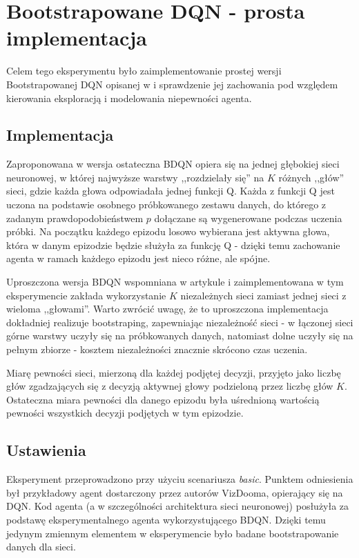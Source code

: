 \section{Bootstrapowane DQN - prosta implementacja}
Celem tego eksperymentu było zaimplementowanie prostej wersji Bootstrapowanej DQN opisanej w \cite{DBLP:journals/corr/OsbandBPR16} i sprawdzenie jej zachowania pod względem kierowania eksploracją i modelowania niepewności agenta.

\subsection{Implementacja}
Zaproponowana w \cite{DBLP:journals/corr/OsbandBPR16} wersja ostateczna BDQN opiera się na jednej głębokiej sieci neuronowej, w której najwyższe warstwy ,,rozdzielały się'' na $K$ różnych ,,głów'' sieci, gdzie każda głowa odpowiadała jednej funkcji Q. Każda z funkcji Q jest uczona na podstawie osobnego próbkowanego zestawu danych, do którego z zadanym prawdopodobieństwem $p$ dołączane są wygenerowane podczas uczenia próbki. Na początku każdego epizodu losowo wybierana jest aktywna głowa, która w danym epizodzie będzie służyła za funkcję Q - dzięki temu zachowanie agenta w ramach każdego epizodu jest nieco różne, ale spójne.

Uproszczona wersja BDQN wspomniana w artykule i zaimplementowana w tym eksperymencie zakłada wykorzystanie $K$ niezależnych sieci zamiast jednej sieci z wieloma ,,głowami''. Warto zwrócić uwagę, że to uproszczona implementacja dokładniej realizuje bootstraping, zapewniając niezależność sieci - w łączonej sieci górne warstwy uczyły się na próbkowanych danych, natomiast dolne uczyły się na pełnym zbiorze - kosztem niezależności znacznie skrócono czas uczenia.

Miarę pewności sieci, mierzoną dla każdej podjętej decyzji, przyjęto jako liczbę głów zgadzających się z decyzją aktywnej głowy podzieloną przez liczbę głów $K$. Ostateczna miara pewności dla danego epizodu była uśrednioną wartością pewności wszystkich decyzji podjętych w tym epizodzie.

\subsection{Ustawienia}
Eksperyment przeprowadzono przy użyciu scenariusza \textit{basic}. Punktem odniesienia był przykładowy agent dostarczony przez autorów VizDooma, opierający się na DQN. Kod agenta (a w szczególności architektura sieci neuronowej) posłużyła za podstawę eksperymentalnego agenta wykorzystującego BDQN. Dzięki temu jedynym zmiennym elementem w eksperymencie było badane bootstrapowanie danych dla sieci.

